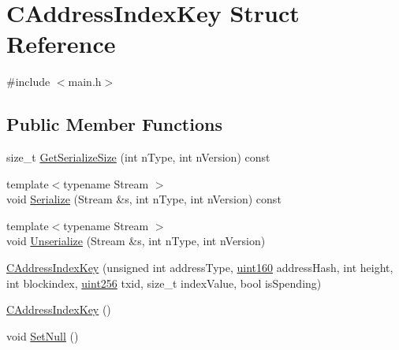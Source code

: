 \hypertarget{struct_c_address_index_key}{}\section{C\+Address\+Index\+Key Struct Reference}
\label{struct_c_address_index_key}


{\ttfamily \#include $<$main.\+h$>$}

\subsection*{Public Member Functions}
\begin{DoxyCompactItemize}
\item 
size\+\_\+t \mbox{\hyperlink{struct_c_address_index_key_ad410ab3488d1392d4678e508cc2cf68f}{Get\+Serialize\+Size}} (int n\+Type, int n\+Version) const
\item 
{\footnotesize template$<$typename Stream $>$ }\\void \mbox{\hyperlink{struct_c_address_index_key_ac793cb952780abc902edaf061dd185b2}{Serialize}} (Stream \&s, int n\+Type, int n\+Version) const
\item 
{\footnotesize template$<$typename Stream $>$ }\\void \mbox{\hyperlink{struct_c_address_index_key_a31da9e393f8c79a697357e117ad02c40}{Unserialize}} (Stream \&s, int n\+Type, int n\+Version)
\item 
\mbox{\hyperlink{struct_c_address_index_key_a2bea7cb1a2c2c82968e1868dbb748f01}{C\+Address\+Index\+Key}} (unsigned int address\+Type, \mbox{\hyperlink{classuint160}{uint160}} address\+Hash, int height, int blockindex, \mbox{\hyperlink{classuint256}{uint256}} txid, size\+\_\+t index\+Value, bool is\+Spending)
\item 
\mbox{\hyperlink{struct_c_address_index_key_a23e505dcc72997d168e0d40acaf21023}{C\+Address\+Index\+Key}} ()
\item 
void \mbox{\hyperlink{struct_c_address_index_key_abb825d2c63b741ab3c7c280511f6cd13}{Set\+Null}} ()
\end{DoxyCompactItemize}
